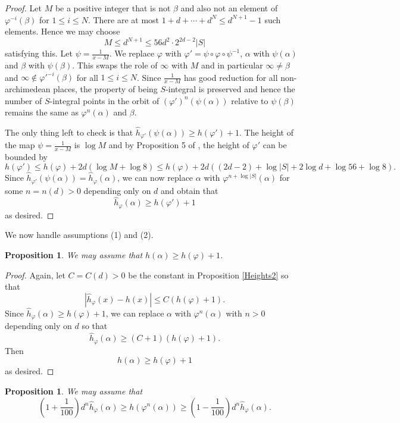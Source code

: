 \documentclass[10pt, reqno]{amsart}
\newcommand{\vphi}{\varphi}
\newcommand{\h}{\widehat{h}}
\numberwithin{theorem}{section}
\newtheorem{proposition}[theorem]{Proposition}
\numberwithin{equation}{section}
\numberwithin{example}{section}
\numberwithin{definition}{section}
\begin{document}
\begin{proof}
Let $M$ be a positive integer that is not $\beta$ and also not an element of $\vphi^{-i}(\beta)$ for $1 \leq i \leq N$. There are at most $1 + d + \cdots + d^N \leq d^{N+1} - 1$ such elements. Hence we may choose 
$$M \leq d^{N+1} \leq 56d^2 \cdot 2^{2d-2} |S|$$
satisfying this. Let $\psi = \frac{1}{x-M}$. We replace $\vphi$ with $\vphi' = \psi \circ \vphi \circ \psi^{-1}$, $\alpha$ with $\psi(\alpha)$ and $\beta$ with $\psi(\beta)$. This swaps the role of $\infty$ with $M$ and in particular $\infty \not = \beta$ and $\infty \not \in \vphi'^{-i}(\beta)$ for all $1 \leq i \leq N$. Since $\frac{1}{x-M}$ has good reduction for all non-archimedean places, the property of being $S$-integral is preserved and hence the number of $S$-integral points in the orbit of $(\vphi')^n(\psi(\alpha))$ relative to $\psi(\beta)$ remains the same as $\vphi^n(\alpha)$ and $\beta$. 
\par 
The only thing left to check is that $\h_{\vphi'}(\psi(\alpha)) \geq h(\vphi')+1$. The height of the map $\psi = \frac{1}{x-M}$ is $\log M$ and by Proposition 5 of \cite{HS11}, the height of $\vphi'$ can be bounded by 
$$h(\vphi') \leq h(\vphi) + 2d (\log M + \log 8) \leq h(\vphi) + 2d ( (2d-2) + \log |S| + 2 \log d + \log 56 + \log 8).$$
Since $\h_{\vphi'}(\psi(\alpha)) = \h_{\vphi}(\alpha)$, we can now replace $\alpha$ with $\vphi^{n + \log |S|}(\alpha)$ for some $n = n(d) > 0$ depending only on $d$ and obtain that 
$$\h_{\vphi}(\alpha) \geq h(\vphi') + 1$$
as desired. 
\end{proof}

We now handle assumptions (1) and (2). 

\begin{proposition} \label{Assumption3}
We may assume that $h(\alpha) \geq h(\vphi) + 1$. 
\end{proposition}

\begin{proof}
Again, let $C = C(d) > 0$ be the constant in Proposition \ref{Heights2} so that 
$$|\h_{\vphi}(x) - h(x)| \leq C(h(\vphi)+1).$$
Since $\h_{\vphi}(\alpha) \geq h(\vphi)+1$, we can replace $\alpha$ with $\vphi^{n}(\alpha)$ with $n > 0$ depending only on $d$ so that 
$$\h_{\vphi}(\alpha) \geq (C+1)(h(\vphi)+1).$$
Then
$$h(\alpha) \geq h(\vphi)+1$$
as desired.
\end{proof}

\begin{proposition} \label{Assumption4}
We may assume that 
$$\left(1+ \frac{1}{100} \right) d^n \h_{\vphi}(\alpha) \geq h(\vphi^n(\alpha)) \geq \left(1 - \frac{1}{100} \right) d^n \h_{\vphi}(\alpha).$$
\end{proposition}
\end{document}
